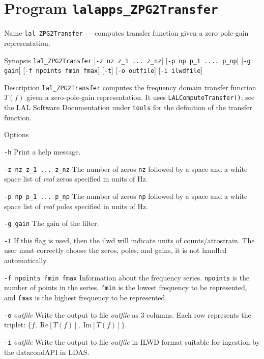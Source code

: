 \section{Program \texttt{lalapps\_ZPG2Transfer}}
\label{program:lalapps-ZPG2transfer}

\begin{entry}

\item[Name]
\verb$lal_ZPG2Transfer$ --- computes transfer function given a
zero-pole-gain representation. 

\item[Synopsis]
\verb$lal_ZPG2Transfer$ [\verb$-z nz z_1 ... z_nz$] [\verb$-p np p_1 .... p_np$] 
                         [\verb$-g gain$] [\verb$-f npoints fmin fmax$] [\verb$-t$]
                         [\verb$-o outfile$] [\verb$-i ilwdfile$]
                         
\item[Description]
\verb$lal_ZPG2Transfer$ computes the frequency domain transfer
function $T(f)$ given a zero-pole-gain representation.   It uses
\verb$LALComputeTransfer()$;  see the LAL Software Documentation under
\texttt{tools} for the definition of the transfer function.

\item[Options]\leavevmode
\begin{entry}
\item[\texttt{-h}]
Print a help message.
\item[\texttt{-z nz z\_1 ... z\_nz}] 
The number of zeros \verb$nz$ followed
by a space and a white space list of \emph{real} zeros specified in units of Hz.
\item[\texttt{-p np p\_1 ... p\_np}] 
The number of zeros \verb$np$ followed
by a space and a white space list of \emph{real} poles specified in units of Hz.
\item[\texttt{-g gain}] 
The gain of the filter.
\item[\texttt{-t}]
If this flag is used,  then the ilwd will indicate units of
counts/attostrain.  The user must correctly choose the zeros, poles,
and gains,  it is not handled automatically.
\item[\texttt{-f npoints fmin fmax}] 
Information about the frequency series.  \verb$npoints$ is the number
of points in the series,  \verb$fmin$ is the lowest frequency to be
represented,  and \verb$fmax$ is the highest frequency to be
represented.   
\item[\texttt{-o} \textit{outfile}]
Write the output to file \textit{outfile} as 3 columns.  Each row
represents the triplet: $\{f,\; \textrm{Re}[T(f)],\; \textrm{Im}[T(f)]\}$.
\item[\texttt{-i} \textit{outfile}]
Write the output to file \textit{outfile} in ILWD format suitable for
ingestion by the datacondAPI in LDAS.
\end{entry}


\end{entry}
